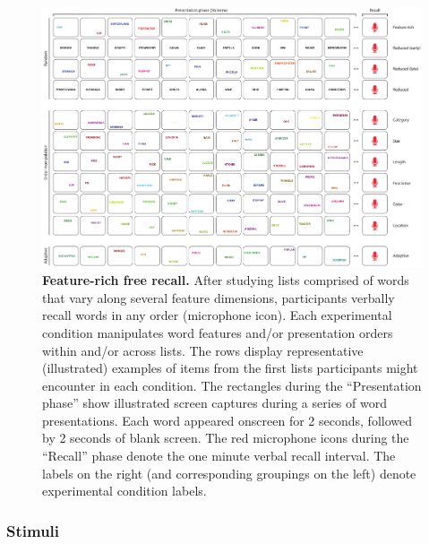 \documentclass[11pt]{article}
\begin{document}
\begin{figure}[tp]
    \centering
        \includegraphics[width=\textwidth]{figures/FRFR}
        
\caption{\textbf{Feature-rich free recall.} After studying lists comprised of
words that vary along several feature dimensions, participants verbally recall
words in any order (microphone icon). Each experimental condition manipulates
word features and/or presentation orders within and/or across lists. The rows
display representative (illustrated) examples of items from the first lists
participants might encounter in each condition. The rectangles during the
``Presentation phase'' show illustrated screen captures during a series of word
presentations. Each word appeared onscreen for 2 seconds, followed by 2 seconds
of blank screen. The red microphone icons during the ``Recall'' phase denote
the one minute verbal recall interval. The labels on the right (and
corresponding groupings on the left) denote experimental condition labels.}

    \label{fig:exp}
\end{figure}



\subsubsection*{Stimuli}
\end{document}
